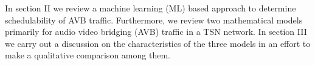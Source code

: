 \documentclass[journal,12pt,twocolumn]{IEEEtran}
\begin{document}
In section II we review a machine learning (ML) based approach to determine schedulability of AVB traffic. Furthermore, we review two mathematical models primarily for audio video bridging (AVB) traffic in a TSN network. In section III we carry out a discussion on the characteristics of the three models in an effort to make a qualitative comparison among them.

%
%
\end{document}
